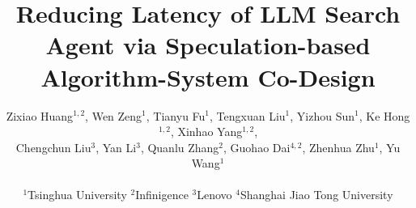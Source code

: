 \documentclass[conference]{IEEEtran}
\begin{document}
\title{Reducing Latency of LLM Search Agent via Speculation-based Algorithm-System Co-Design}

\author{
    Zixiao Huang$^{1,2}$,
    Wen Zeng$^{1}$,
    Tianyu Fu$^{1}$,
    Tengxuan Liu$^{1}$,
    Yizhou Sun$^{1}$,
    Ke Hong$^{1,2}$,
    Xinhao Yang$^{1,2}$, \\
    Chengchun Liu$^{3}$,
    Yan Li$^{3}$,
    Quanlu Zhang$^{2}$,
    Guohao Dai$^{4,2}$,
    Zhenhua Zhu$^{1}$,
    Yu Wang$^{1}$\\
    \\
    $^{1}$Tsinghua University
    $^{2}$Infinigence 
    $^{3}$Lenovo
    $^{4}$Shanghai Jiao Tong University
}

\end{document}
